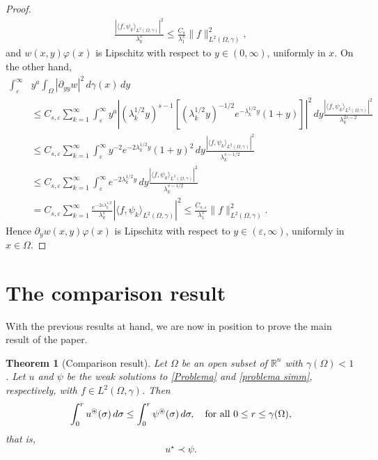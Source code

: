 \documentclass[a4paper,10pt,reqno]{amsart}
\newcommand{\e}{\varepsilon}
\newtheorem{theorem}{Theorem}[section]
\numberwithin{equation}{section}
\begin{document}
\begin{proof}
\begin{align*}
\frac{|\langle f,\psi_{k}\rangle_{L^{2}(\Omega,\gamma)}|^2}{\lambda_k^{s}}
\leq \frac{C_s}{\lambda_{1}^{s}}\|f\|^{2}_{L^{2}(\Omega,\gamma)},
\end{align*}
and $w(x,y)\varphi(x)$ is Lipschitz with respect to $y\in(0,\infty)$, uniformly in $x$.
On the other hand,
\begin{align*}
\int_{\e}^{\infty}&y^a\int_{\Omega}|\partial_{yy}w|^{2}\,d\gamma(x)\,dy \\
&\leq C_{s,\varepsilon}\sum_{k=1}^{\infty}\int_\e^\infty y^a|(\lambda_k^{1/2}y)^{s-1}[(\lambda_k^{1/2}y)^{-1/2}
e^{-\lambda_k^{1/2}y}(1+y)]|^2\,dy
\frac{|\langle f,\psi_{k}\rangle_{L^{2}(\Omega,\gamma)}|^2}{\lambda_k^{2s-2}}\\
&\leq C_{s,\varepsilon}\sum_{k=1}^{\infty}\int_\e^\infty y^{-2}e^{-2\lambda_k^{1/2}y}(1+y)^2\,dy
\frac{|\langle f,\psi_{k}\rangle_{L^{2}(\Omega,\gamma)}|^2}{\lambda_k^{s-1/2}}\\
&\leq C_{s,\varepsilon}\sum_{k=1}^{\infty}\int_\e^\infty e^{-2\lambda_k^{1/2}y}\,dy
\frac{|\langle f,\psi_{k}\rangle_{L^{2}(\Omega,\gamma)}|^2}{\lambda_k^{s-1/2}}\\
&= C_{s,\varepsilon}\sum_{k=1}^{\infty}\frac{e^{-2\e\lambda_{k}^{1/2}}}{\lambda_k^s}
|\langle f,\psi_{k}\rangle_{L^{2}(\Omega,\gamma)}|^{2}\leq
\frac{C_{s,\varepsilon}}{\lambda_1^s}\|f\|^{2}_{L^{2}(\Omega,\gamma)}.
\end{align*}
Hence $\partial_{y}w(x,y)\varphi(x)$ is Lipschitz
with respect to $y\in(\e,\infty)$, uniformly in $x\in\Omega$.
\end{proof}

\section{The comparison result}\label{Section:comparison}

With the previous results at hand, we are now in position to prove the main result of the paper.

\begin{theorem}[Comparison result]\label{primoteoremadiconfronto}
Let $\Omega$ be an open subset of $\mathbb{R}^{n}$ with $\gamma(\Omega)<1$.
Let $u$ and $\psi$ be the weak solutions to \eqref{Problema} and \eqref{problema simm}, respectively,
with $f\in L^{2}(\Omega,\gamma)$. Then
\begin{equation}\int_{0}^{r}u^{\circledast}(\sigma)\,d\sigma\leq\int_{0}^{r}\psi^{\circledast}(\sigma)\,d\sigma,\label{confronto}
\quad\hbox{for all}~0\leq r\leq \gamma(\Omega),\end{equation}
that is,
\[
u^{\displaystyle\star}\prec  \psi.
\]
\end{theorem}
\end{document}
